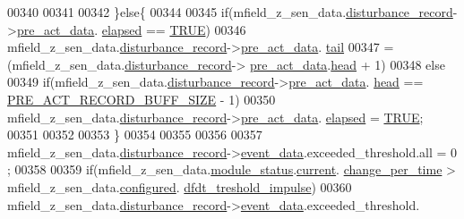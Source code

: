 \begin{DoxyCode}
00340    
00341      
00342     \}\textcolor{keywordflow}{else}\{
00344    
00345     \textcolor{keywordflow}{if}(mfield\_z\_sen\_data.\hyperlink{a00027_ac9b38e2c1d3f1013a88d33506c754152}{disturbance\_record}->\hyperlink{a00028_aab01e8da056827bc5c9caff9b64c78be}{pre\_act\_data}.
      \hyperlink{a00022_abecaedb3605e8bca8335cd81ca63025f}{elapsed} == \hyperlink{a00040_aa8cecfc5c5c054d2875c03e77b7be15d}{TRUE})
00346     mfield\_z\_sen\_data.\hyperlink{a00027_ac9b38e2c1d3f1013a88d33506c754152}{disturbance\_record}->\hyperlink{a00028_aab01e8da056827bc5c9caff9b64c78be}{pre\_act\_data}.
      \hyperlink{a00022_ab3bcc08acd9d73ce1a44992255658e37}{tail}
00347             = (mfield\_z\_sen\_data.\hyperlink{a00027_ac9b38e2c1d3f1013a88d33506c754152}{disturbance\_record}->
      \hyperlink{a00028_aab01e8da056827bc5c9caff9b64c78be}{pre\_act\_data}.\hyperlink{a00022_a15a6827ccabba1c22396eccc1c5c654b}{head} + 1)%
00348     \textcolor{keywordflow}{else}
00349     \textcolor{keywordflow}{if}(mfield\_z\_sen\_data.\hyperlink{a00027_ac9b38e2c1d3f1013a88d33506c754152}{disturbance\_record}->\hyperlink{a00028_aab01e8da056827bc5c9caff9b64c78be}{pre\_act\_data}.
      \hyperlink{a00022_a15a6827ccabba1c22396eccc1c5c654b}{head} == \hyperlink{a00022_a18dcecc16ded13fa622e0913e73442e6}{PRE\_ACT\_RECORD\_BUFF\_SIZE} - 1)
00350     mfield\_z\_sen\_data.\hyperlink{a00027_ac9b38e2c1d3f1013a88d33506c754152}{disturbance\_record}->\hyperlink{a00028_aab01e8da056827bc5c9caff9b64c78be}{pre\_act\_data}.
      \hyperlink{a00022_abecaedb3605e8bca8335cd81ca63025f}{elapsed} = \hyperlink{a00040_aa8cecfc5c5c054d2875c03e77b7be15d}{TRUE};
00351 
00352 
00353     \}
00354 
00355 
00356 
00357     mfield\_z\_sen\_data.\hyperlink{a00027_ac9b38e2c1d3f1013a88d33506c754152}{disturbance\_record}->\hyperlink{a00028_a8c0bda69e71ef674e60da47ad0be9ab0}{event\_data}.exceeded\_threshold.all = 0
      ;
00358 
00359     \textcolor{keywordflow}{if}(mfield\_z\_sen\_data.\hyperlink{a00027_adfab5a5d8b45a93dfb13edb24e2b80e3}{module\_status}.\hyperlink{a00019_acf41ffc11da291c2f9f0fcb02ee72b98}{current}.
      \hyperlink{a00019_a0f645dd76b41adc6a966feba8e4bff8c}{change\_per\_time} > mfield\_z\_sen\_data.\hyperlink{a00027_a94b2d1f6ea4ab334c74d24984dd27843}{configured}.
      \hyperlink{a00021_a3b9c683370c94430a4c6a9d78ce6f5ef}{dfdt\_treshold\_impulse})
00360         mfield\_z\_sen\_data.\hyperlink{a00027_ac9b38e2c1d3f1013a88d33506c754152}{disturbance\_record}->\hyperlink{a00028_a8c0bda69e71ef674e60da47ad0be9ab0}{event\_data}.exceeded\_threshold.

\end{DoxyCode}
